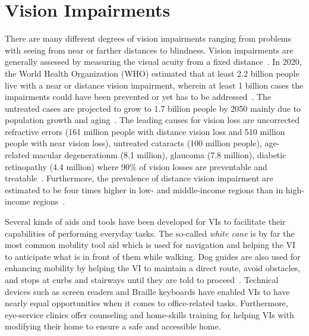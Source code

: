 \section{Vision Impairments}
There are many different degrees of vision impairments ranging from problems with seeing from near or farther distances to blindness. Vision impairments are generally assessed by measuring the visual acuity from a fixed distance~\cite{who2019world}. In 2020, the World Health Organization (WHO) estimated that at least 2.2 billion people live with a near or distance vision impairment, wherein at least 1 billion cases the impairments could have been prevented or yet has to be addressed~\cite{who2019world}. The untreated cases are projected to grow to 1.7 billion people by 2050 mainly due to population growth and aging~\cite{bourne2021trends}. The leading causes for vision loss are uncorrected refractive errors (161 million people with distance vision loss and 510 million people with near vision loss), untreated cataracts (100 million people), age-related macular degenerationm (8.1 million), glaucoma (7.8 million), diabetic retinopathy (4.4 million) where 90\% of vision losses are preventable and treatable~\cite{steinmetz2021causes}. Furthermore, the prevalence of distance vision impairment are estimated to be four times higher in low- and middle-income regions than in high-income regions~\cite{steinmetz2021causes}.  

Several kinds of aids and tools have been developed for VIs to facilitate their capabilities of performing everyday tasks. The so-called \textit{white cane} is by far the most common mobility tool aid which is used for navigation and helping the VI to anticipate what is in front of them while walking. Dog guides are also used for enhancing mobility by helping the VI to maintain a direct route, avoid obstacles, and stops at curbs and stairways until they are told to proceed~\cite{manduchi2012computer}. Technical devices such as screen readers and Braille keyboards have enabled VIs to have nearly equal opportunities when it comes to office-related tasks. Furthermore, eye-service clinics offer counseling and home-skills training for helping VIs with modifying their home to ensure a safe and accessible home. 








